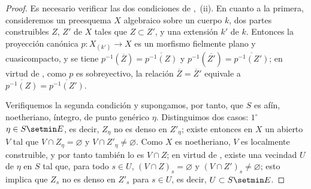 \begin{proof}
Es necesario verificar las dos condiciones de ,~(ii).
En cuanto a la primera, consideremos un preesquema $X$ algebraico sobre un cuerpo $k$, dos partes construibles $Z$, $Z'$ de $X$ tales que $Z\subset Z'$, y una extensión $k'$ de $k$.
Entonces la proyección canónica $p:X_{(k')}\to X$ es un morfismo fielmente plano y cuasicompacto, y se tiene $p^{-1}(\overline Z)=\overline{p^{-1}(Z)}$ y $p^{-1}(\overline{Z'})=\overline{p^{-1}(Z')}$; en virtud de , como $p$ es sobreyectivo, la relación $\overline Z=\overline Z'$ equivale a $\overline{p^{-1}(Z)}=\overline{p^{-1}(Z')}$.

Verifiquemos la segunda condición y supongamos, por tanto, que $S$ es afín, noetheriano, íntegro, de punto genérico $\eta$.
Distinguimos dos casos:
$1^\circ$ $\eta\in S\setmin E$, es decir, $Z_\eta$ no es denso en $Z'_\eta$; existe entonces en $X$ un abierto $V$ tal que $V\cap Z_\eta=\varnothing$ y $V\cap Z'_\eta\neq\varnothing$.
  Como $X$ es noetheriano, $V$ es localmente construible, y por tanto también lo es $V\cap Z$; en virtud de , existe una vecindad $U$ de $\eta$ en $S$ tal que, para todo $s\in U$, $(V\cap Z)_s=\varnothing$ y $(V\cap Z')_s\neq\varnothing$; esto implica que $Z_s$ no es denso en $Z'_s$ para $s\in U$, es decir, $U\subset S\setmin E$.



\end{proof}
